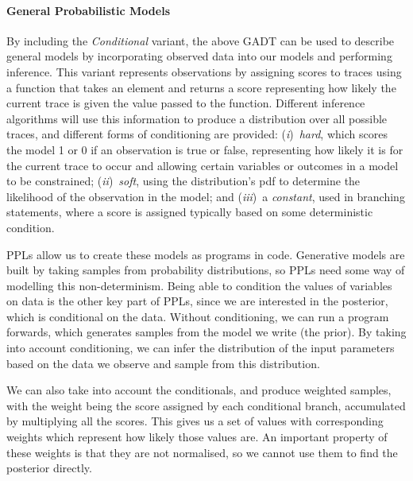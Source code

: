\documentclass[sigconf,timestamp]{acmart}
\newcommand{\one}{({\em i})\/}
\newcommand{\two}{({\em ii})\/}
\newcommand{\three}{({\em iii})\/}
\begin{document}
\paragraph{General Probabilistic Models}
By including the \emph{Conditional} variant, the above GADT can be used to describe general models by incorporating observed data into our models and performing inference. This variant represents observations by assigning scores to traces using a function that takes an element and returns a score representing how likely the current trace is given the value passed to the function. Different inference algorithms will use this information to produce a distribution over all possible traces, and different forms of conditioning are provided: \one~\emph{hard}, which scores the model 1 or 0 if an observation is true or false,  representing how likely it is for the current trace to occur and allowing certain variables or outcomes in a model to be constrained; \two~\emph{soft}, using the distribution's pdf to determine the likelihood of the observation in the model; and \three~a \emph{constant}, used in branching statements, where a score is assigned typically based on some deterministic condition.

PPLs allow us to create these models as programs in code. Generative models are built by taking samples from probability distributions, so PPLs need some way of modelling this non-determinism. Being able to condition the values of variables on data is the other key part of PPLs, since we are interested in the posterior, which is conditional on the data. Without conditioning, we can run a program forwards, which generates samples from the model we write (the prior). By taking into account conditioning, we can infer the distribution of the input parameters based on the data we observe and sample from this distribution.

We can also take into account the conditionals, and produce weighted samples, with the weight being the score assigned by each conditional branch, accumulated by multiplying all the scores. This gives us a set of values with corresponding weights which represent how likely those values are. An important property of these weights is that they are not normalised, so we cannot use them to find the posterior directly.
\end{document}
